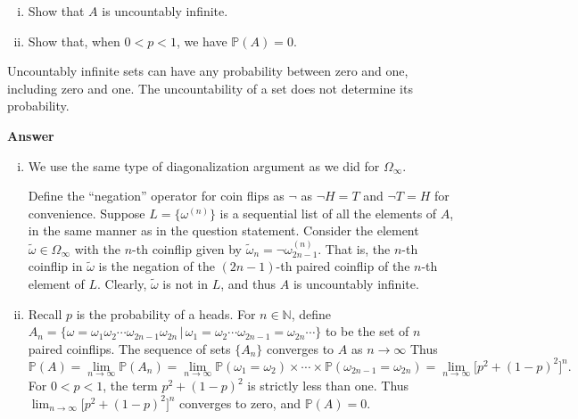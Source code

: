 \documentclass[11pt]{article}
\renewcommand\P{\mathbb{P}} %
\newcounter{question}[section]
\newenvironment{hwanswer}
    {
        \vspace{2mm}
        {\bfseries Answer}
        \vspace{-\abovedisplayskip}
        \begin{center}
            \begin{tcolorbox}[
                width=0.95\textwidth,
                colback=white,
                colframe=white,
                opacityback=0,
                opacityframe=0,
                boxrule=0pt,
                frame hidden,
                breakable,
                before upper={\parindent15pt} %
            ]
            \lineskip=0pt %
    }
    {
        \end{tcolorbox}
        \end{center}
        \vspace{4mm}
    }
\begin{document}
\begin{hwquestion}
        \vspace{2mm}

        \begin{enumerate}[(i), nolistsep]
            \item Show that $A$ is uncountably infinite.
            \item Show that, when $0 < p < 1$, we have $\P(A) = 0$.
        \end{enumerate}

        \noindent Uncountably infinite sets can have any probability between zero and one,
        including zero and one. The uncountability of a set does not determine its
        probability.
    \end{hwquestion}

    \begin{hwanswer}
        \begin{enumerate}[(i), nolistsep]
            \item We use the same type of diagonalization argument as we did for
            $\Omega_{\infty}$.

            Define the ``negation'' operator for coin flips as $\neg$ as $\neg H = T$ and
            $\neg T = H$ for convenience. Suppose $L = \{ \omega^{(n)} \}$ is a sequential
            list of all the elements of $A$, in the same manner as in the question
            statement. Consider the element $\widetilde{\omega} \in \Omega_{\infty}$ with
            the $n$-th coinflip given by $\widetilde{\omega}_{n} = \neg \omega_{2n-1}^{(n)}$.
            That is, the $n$-th coinflip in $\widetilde{\omega}$ is the negation of the
            $(2n-1)$-th paired coinflip of the $n$-th element of $L$. Clearly, $\widetilde{
            \omega}$ is not in $L$, and thus $A$ is uncountably infinite.

            \item Recall $p$ is the probability of a heads. For $n \in \mathbb{N}$, define
            $
            A_n = \big\{
                \omega =
                \omega_1
                \omega_2
                \cdots
                \omega_{2n-1}
                \omega_{2n}
                \, | \,
                \omega_1
                =
                \omega_2
                \cdots
                \omega_{2n-1}
                =
                \omega_{2n}
                \cdots
            \big\}
            $
            to be the set of $n$ paired coinflips. The sequence of sets $\{ A_n \}$
            converges to $A$ as $n \to \infty$ Thus
            \[
                \P(A)
                =
                \lim_{n \to \infty} \P(A_n)
                =
                \lim_{n \to \infty}
                \P(\omega_1 = \omega_2)
                \times
                \cdots
                \times
                \P(\omega_{2n-1} = \omega_{2n})
                =
                \lim_{n \to \infty}
                \big[ p^2 + (1 - p)^2 \big]^n.
            \]
            For $0 < p < 1$, the term $p^2 + (1 - p)^2$ is strictly less than one. Thus
            $\lim_{n \to \infty} \big[ p^2 + (1 - p)^2 \big]^n$ converges to zero, and
            $\P(A) = 0$.
        \end{enumerate}
    \end{hwanswer}
\end{document}

